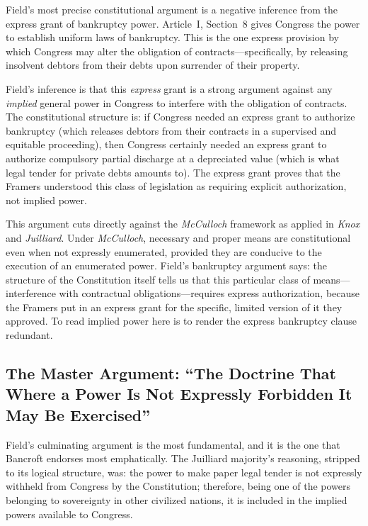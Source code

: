 \documentclass[12pt]{article}
\begin{document}
Field's most precise constitutional argument is a negative inference from
the express grant of bankruptcy power. Article~I, Section~8 gives
Congress the power to establish uniform laws of bankruptcy. This is the
one express provision by which Congress may alter the obligation of
contracts---specifically, by releasing insolvent debtors from their debts
upon surrender of their property.

Field's inference is that this \textit{express} grant is a strong
argument against any \textit{implied} general power in Congress to
interfere with the obligation of contracts. The constitutional structure
is: if Congress needed an express grant to authorize bankruptcy (which
releases debtors from their contracts in a supervised and equitable
proceeding), then Congress certainly needed an express grant to authorize
compulsory partial discharge at a depreciated value (which is what
legal tender for private debts amounts to). The express grant proves
that the Framers understood this class of legislation as requiring
explicit authorization, not implied power.

This argument cuts directly against the \textit{McCulloch} framework
as applied in \textit{Knox} and \textit{Juilliard}. Under
\textit{McCulloch}, necessary and proper means are constitutional even
when not expressly enumerated, provided they are conducive to the
execution of an enumerated power. Field's bankruptcy argument says:
the structure of the Constitution itself tells us that this particular
class of means---interference with contractual obligations---requires
express authorization, because the Framers put in an express grant
for the specific, limited version of it they approved. To read implied
power here is to render the express bankruptcy clause redundant.

\subsection{The Master Argument: ``The Doctrine That Where a Power Is
Not Expressly Forbidden It May Be Exercised''}

Field's culminating argument is the most fundamental, and it is the
one that Bancroft endorses most emphatically. The Juilliard majority's
reasoning, stripped to its logical structure, was: the power to make
paper legal tender is not expressly withheld from Congress by the
Constitution; therefore, being one of the powers belonging to sovereignty
in other civilized nations, it is included in the implied powers available
to Congress.
\end{document}
